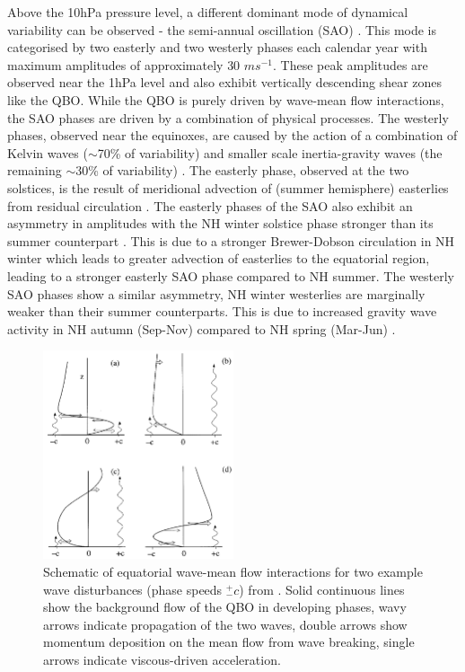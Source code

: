 Above the 10hPa pressure level, a different dominant mode of dynamical variability can be observed - the semi-annual oscillation (SAO) \citep{Baldwin2001}. This mode is categorised by two easterly and two westerly phases each calendar year with maximum amplitudes of approximately 30 $ms^{-1}$. These peak amplitudes are observed near the 1hPa level and also exhibit vertically descending shear zones like the QBO. While the QBO is purely driven by wave-mean flow interactions, the SAO phases are driven by a combination of physical processes. The westerly phases, observed near the equinoxes, are caused by the action of a combination of Kelvin waves ($\sim$70\% of variability) and smaller scale inertia-gravity waves (the remaining $\sim$30\% of variability) \citep{dunkertonRole1979,hitchmanEstimation1988}. The easterly phase, observed at the two solstices, is the result of meridional advection of (summer hemisphere) easterlies from residual circulation \citep{holtonNumerical1980}. The easterly phases of the SAO also exhibit an asymmetry in amplitudes with the NH winter solstice phase stronger than its summer counterpart \citep{dunkertonRole1979}. This is due to a stronger Brewer-Dobson circulation in NH winter which leads to greater advection of easterlies to the equatorial region, leading to a stronger easterly SAO phase compared to NH summer. The westerly SAO phases show a similar asymmetry, NH winter westerlies are marginally weaker than their summer counterparts. This is due to increased gravity wave activity in NH autumn (Sep-Nov) compared to NH spring (Mar-Jun) \citep{rayAnalysis1998}. 

\begin{figure}[h!]
\centering
    \includegraphics[width=0.5\textwidth]{Figures/Figures-background/Schematic_of_QBO_waves.png}
    \caption[Schematic of equatorial wave-mean flow interactions.]{Schematic of equatorial wave-mean flow interactions for two example wave disturbances (phase speeds $^+_- c$) from \cite{plumbQuasibiennial1984}. Solid continuous lines show the background flow of the QBO in developing phases, wavy arrows indicate propagation of the two waves, double arrows show momentum deposition on the mean flow from wave breaking, single arrows indicate viscous-driven acceleration.}
    \label{fig:QBO_wave_schematic}
\centering
\end{figure}

